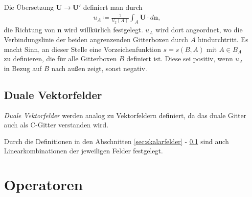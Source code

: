 \documentclass{book}
\begin{document}
Die Übersetzung $\mathbf{U}\to\mathbf{U}'$ definiert man durch
%
\begin{eqnarray}
u_A \coloneqq\frac{1}{V_2\left(A\right)}\int_A\mathbf{U}\cdot d\mathbf{n}, 
\end{eqnarray}
%
die Richtung von $\mathbf{n}$ wird willkürlich festgelegt. $u_A$ wird dort angeordnet, wo die Verbindungslinie der beiden angrenzenden Gitterboxen durch $A$ hindurchtritt. Es macht Sinn, an dieser Stelle eine Vorzeichenfunktion $s = s\left(B, A\right)$ mit $A\in B_A$ zu definieren, die für alle Gitterboxen $B$ definiert ist. Diese sei positiv, wenn $u_A$ in Bezug auf $B$ nach außen zeigt, sonst negativ.

\subsection{Duale Vektorfelder}
\label{sec:duale_vektorfelder}

\textit{Duale Vektorfelder} werden analog zu Vektorfeldern definiert, da das duale Gitter auch als C-Gitter verstanden wird.

Durch die Definitionen in den Abschnitten \ref{sec:skalarfelder} - \ref{sec:duale_vektorfelder} sind auch Linearkombinationen der jeweiligen Felder festgelegt.

\section{Operatoren}
\label{sec:operatoren}
\end{document}
